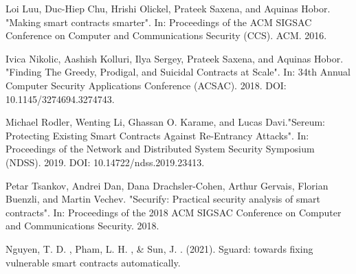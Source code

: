 \documentclass{SCIS2022cn}
\begin{document}
\begin{thebibliography}{99}
     Loi Luu, Duc-Hiep Chu, Hrishi Olickel, Prateek Saxena, and Aquinas Hobor. "Making smart contracts smarter". In: Proceedings of the ACM SIGSAC Conference on Computer and Communications Security (CCS). ACM. 2016.

     Ivica Nikolic, Aashish Kolluri, Ilya Sergey, Prateek Saxena, and Aquinas Hobor. "Finding The Greedy, Prodigal, and Suicidal Contracts at Scale". In: 34th Annual Computer Security Applications Conference (ACSAC). 2018. DOI: 10.1145/3274694.3274743.

     Michael Rodler, Wenting Li, Ghassan O. Karame, and Lucas Davi."Sereum: Protecting Existing Smart Contracts Against Re-Entrancy Attacks". In: Proceedings of the Network and Distributed System Security Symposium (NDSS). 2019. DOI: 10.14722/ndss.2019.23413.

     Petar Tsankov, Andrei Dan, Dana Drachsler-Cohen, Arthur Gervais, Florian Buenzli, and Martin Vechev. "Securify: Practical security analysis of smart contracts". In: Proceedings of the 2018 ACM SIGSAC Conference on Computer and Communications Security. 2018.

     Nguyen, T. D. ,  Pham, L. H. , \&  Sun, J. . (2021). Sguard: towards fixing vulnerable smart contracts automatically.

\end{thebibliography}





\end{document}
